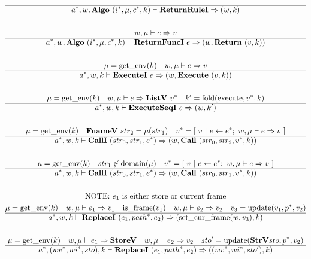 \begin{gather*}
%
\newline \\
  \hline
  \seq{a}, w, \algo~ (\seq{i}, \mu, \seq c, k) \vdash \returnrulei \Rightarrow (w, k) \\
%
\newline \\
  w, \mu \vdash e \Rightarrow v \\
  \hline
  \seq{a}, w, \algo ~ (\seq{i}, \mu, \seq c, k) \vdash \returnfunci ~ e \Rightarrow (w, \ret ~ (v, k)) \\
%
\newline \\
  \mu = \getenv(k) \quad
  w, \mu \vdash e \Rightarrow v \\
  \hline
  \seq{a}, w, k \vdash \executei ~ e \Rightarrow (w, \exe ~ (v, k)) \\
%
\newline \\
  \mu = \getenv(k) \quad
  w, \mu \vdash e \Rightarrow \listv ~ \seq v \quad
  k' = \fold(\execute, \seq v, k) \\
  \hline
  \seq{a}, w, k \vdash \executeseqi ~ e \Rightarrow (w, k') \\
%
\newline \\
  \mu = \getenv(k) \quad
  \fnamev ~ str_2 = \mu(str_1) \quad
  \seq{v} = [ ~ v ~ | ~ e \leftarrow \seq{e}; ~ w, \mu \vdash e \Rightarrow v ~ ] \\
  \hline
  \seq{a}, w, k \vdash \calli ~ (str_0, str_1, \seq e) \Rightarrow (w, \call ~ (str_0, str_2, \seq v, k)) \\
%
\newline \\
  \mu = \getenv(k) \quad
  str_1 \not\in \domain(\mu) \quad
  \seq{v} = [ ~ v ~ | ~ e \leftarrow \seq{e}; ~ w, \mu \vdash e \Rightarrow v ~ ] \\
  \hline
  \seq{a}, w, k \vdash \calli ~ (str_0, str_1, \seq e) \Rightarrow (w, \call ~ (str_0, str_1, \seq v, k)) \\
%
\newline \\
\text{NOTE: $e_1$ is either store or current frame} \\
  \mu = \getenv(k) \quad
  w, \mu \vdash e_1 \Rightarrow v_1 \quad
  \isframe(v_1) \quad
  w, \mu \vdash e_2 \Rightarrow v_2 \quad
  v_3 = \update(v_1, \seq p, v_2) \\
  \hline
  \seq{a}, w, k \vdash \replacei ~ (e_1, \seq{path}, e_2) \Rightarrow (\setcurframe(w, v_3), k) \\
%
\newline \\
  \mu = \getenv(k) \quad
  w, \mu \vdash e_1 \Rightarrow \storev \quad
  w, \mu \vdash e_2 \Rightarrow v_2 \quad
  sto' = \update(\strv sto, \seq p, v_2) \\
  \hline
  \seq{a}, (\seq{wv}, \seq{wi}, sto), k \vdash \replacei ~ (e_1, \seq{path}, e_2)
  \Rightarrow ((\seq{wv}, \seq{wi}, sto'), k) \\
\end{gather*}
